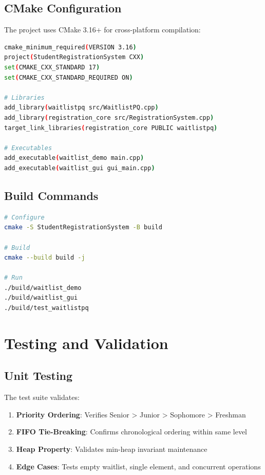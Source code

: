 \documentclass[12pt,a4paper]{article}
\begin{document}
\subsection{CMake Configuration}
The project uses CMake 3.16+ for cross-platform compilation:

\begin{lstlisting}[caption=CMake Configuration, language=bash]
cmake_minimum_required(VERSION 3.16)
project(StudentRegistrationSystem CXX)
set(CMAKE_CXX_STANDARD 17)
set(CMAKE_CXX_STANDARD_REQUIRED ON)

# Libraries
add_library(waitlistpq src/WaitlistPQ.cpp)
add_library(registration_core src/RegistrationSystem.cpp)
target_link_libraries(registration_core PUBLIC waitlistpq)

# Executables
add_executable(waitlist_demo main.cpp)
add_executable(waitlist_gui gui_main.cpp)
\end{lstlisting}

\subsection{Build Commands}
\begin{lstlisting}[caption=Build Instructions, language=bash]
# Configure
cmake -S StudentRegistrationSystem -B build

# Build
cmake --build build -j

# Run
./build/waitlist_demo
./build/waitlist_gui
./build/test_waitlistpq
\end{lstlisting}

\section{Testing and Validation}

\subsection{Unit Testing}
The test suite validates:

\begin{enumerate}
    \item \textbf{Priority Ordering}: Verifies Senior > Junior > Sophomore > Freshman
    \item \textbf{FIFO Tie-Breaking}: Confirms chronological ordering within same level
    \item \textbf{Heap Property}: Validates min-heap invariant maintenance
    \item \textbf{Edge Cases}: Tests empty waitlist, single element, and concurrent operations
\end{enumerate}
\end{document}
